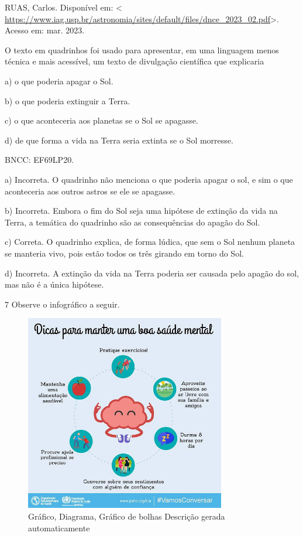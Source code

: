 {RUAS, Carlos. Disponível em: \textless{}
\url{https://www.iag.usp.br/astronomia/sites/default/files/dnce_2023_02.pdf}\textgreater.
Acesso em: mar. 2023.

O texto em quadrinhos foi usado para apresentar, em uma linguagem menos
técnica e mais acessível, um texto de divulgação científica que
explicaria

a) o que poderia apagar o Sol.

b) o que poderia extinguir a Terra.

c) o que aconteceria aos planetas se o Sol se apagasse.

d) de que forma a vida na Terra seria extinta se o Sol morresse.

BNCC: EF69LP20.

a) Incorreta. O quadrinho não menciona o que poderia apagar o sol, e sim
o que aconteceria aos outros astros se ele se apagasse.

b) Incorreta. Embora o fim do Sol seja uma hipótese de extinção da vida
na Terra, a temática do quadrinho são as consequências do apagão do Sol.

c) Correta. O quadrinho explica, de forma lúdica, que sem o Sol nenhum
planeta se manteria vivo, pois estão todos os três girando em torno do
Sol.

d) Incorreta. A extinção da vida na Terra poderia ser causada pelo
apagão do sol, mas não é a única hipótese.

\num{7} Observe o infográfico a seguir.

\begin{figure}
\centering
\includegraphics[width=3.43333in,height=3.37681in]{./imgSAEB_6_POR/media/image15.jpeg}
\caption{Gráfico, Diagrama, Gráfico de bolhas Descrição gerada
automaticamente}
\end{figure}

}
